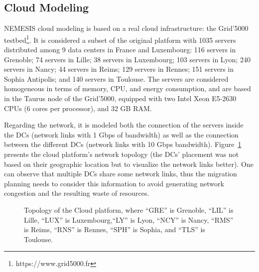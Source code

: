 \subsection{Cloud Modeling}\label{sec:cloud_model}

NEMESIS cloud modeling is based on a real cloud infrastructure: the Grid'5000 testbed\footnote{https://www.grid5000.fr}. It is considered a subset of the original platform with 1035 servers distributed among 9 data centers in France and Luxembourg: 116 servers in Grenoble; 74 servers in Lille; 38 servers in Luxembourg; 103 servers in Lyon; 240 servers in Nancy; 44 servers in Reims;  129 servers in Rennes;  151 servers in Sophia Antipolis; and 140 servers in Toulouse. The servers are considered homogeneous in terms of memory, CPU, and energy consumption, and are based in the Taurus node of the Grid'5000, equipped with two Intel Xeon E5-2630 CPUs (6 cores per processor), and 32 GB RAM.

Regarding the network, it is modeled both the connection of the servers inside the DCs (network links with 1 Gbps of bandwidth) as well as the connection between the different DCs  (network links with 10 Gbps bandwidth). Figure~\ref{fig:topology} presents the cloud platform's network topology (the DCs' placement was not based on their geographic location but to visualize the network links better). One can observe that multiple DCs share some network links, thus the migration planning needs to consider this information to avoid generating network congestion and the resulting waste of resources.

\begin{figure}[ht]
  \centering
   {}
  \caption{Topology of the Cloud platform, where ``GRE'' is Grenoble,  ``LIL'' is Lille, ``LUX'' is Luxembourg,``LY'' is Lyon, ``NCY'' is Nancy, ``RMS'' is Reims,  ``RNS'' is Rennes, ``SPH'' is Sophia, and  ``TLS'' is Toulouse.}
  \label{fig:topology}
 \end{figure}
 


